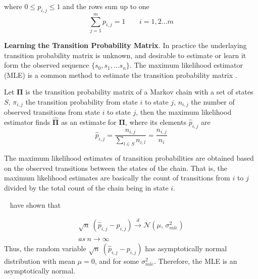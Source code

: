 where $0 \leq p_{i,j}\leq 1 $ and the rows sum up to one 
\begin{equation}
\sum_{j=1}^{m} p_{i,j}= 1\ \ \ \ \ \ \ \ \ i=1,2 \ldots m
\end{equation}

\textbf{Learning the Transition Probability Matrix}. In practice the underlaying transition probability matrix is unknown, and desirable to estimate or learn it form the observed sequence $\{s_0, s_1, \ldots s_n\}$. The maximum likelihood estimator (MLE) is a common method to estimate the transition probability matrix \cite{anderson1957statistical}.


\begin{definition}
	Let $\boldsymbol{\Pi}$ is the transition probability matrix of a Markov chain with a set of states $S$, 
	$\pi_{i,j}$ the transition probability from state $i$ to state $j$,
	$n_{i,j}$ the number of observed transitions from state $i$ to state $j$,
	then the maximum likelihood estimator finds $\boldsymbol{\hat{\Pi}}$ as an estimate for $\boldsymbol{\Pi}$, where its elements $\hat{p}_{i,j}$ are
	\begin{equation}
	\label{eq:pi_estim}
	\hat{p}_{i,j}=\frac{n_{i,j}}{\sum_{l \in S} n_{i,l}}=\frac{n_{i,j}}{n_{i}}
	\end{equation}
	
\end{definition} 


	The maximum likelihood estimates of transition probabilities are obtained based on the observed transitions between the states of the chain. That is, the maximum likelihood estimates are basically the count of transitions from $i$ to $j$ divided by the total count of the chain being in state $i$.  
	
	\par ~\citet{anderson1957statistical} have shown that 
	
	

	\begin{equation}
	\begin{aligned}
	\label{eq:lim_dist}
	 \sqrt{n}\ (\hat{p}_{i,j} - {p}_{i,j}) \xrightarrow{d} \mathcal{N}(\mu,\,\sigma^{2}_{mle})\\
	 as\ n \xrightarrow{} \infty
	 \end{aligned}
	\end{equation}
Thus, the random variable $\sqrt{n}\ (\hat{p}_{i,j} - {p}_{i,j})$ has asymptotically normal distribution with mean $\mu=0$, and for some $\sigma^{2}_{mle}$. Therefore, the MLE is an asymptotically normal. 

